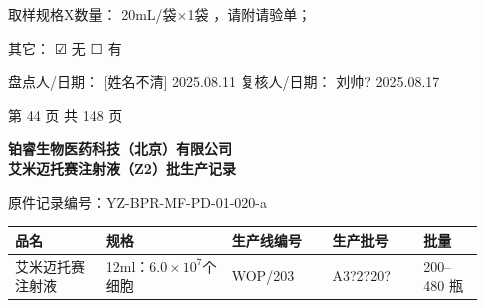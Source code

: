 \documentclass[UTF8,10pt,a4paper,fontset=fandol]{ctexart}
\newcommand{\fieldvalue}[1]{#1}
\newcommand{\handwritten}[1]{#1}
\newcommand{\checkboxfield}[1]{\ifstrequal{#1}{checked}{☑}{\ifstrequal{#1}{unclear}{?}{☐}}}
\begin{document}
\medskip

取样规格X数量：
\fieldvalue{\handwritten{20mL/袋$\times$1袋}}
，请附请验单；

\medskip

其它：
\fieldvalue{\handwritten{\checkboxfield{checked}}} 无
%
\fieldvalue{\checkboxfield{unchecked}} 有
\underline{\hspace{3cm}}

\medskip

盘点人/日期：
\fieldvalue{\handwritten{[姓名不清] 2025.08.11}}
\hfill
复核人/日期：
\fieldvalue{\handwritten{刘帅? 2025.08.17}}

\vfill

\begin{center}
第 44 页 共 148 页
\end{center}

\newpage

\begin{center}
\textbf{铂睿生物医药科技（北京）有限公司}\\
\textbf{艾米迈托赛注射液（Z2）批生产记录}
\end{center}

\noindent
原件\hfill 记录编号：YZ-BPR-MF-PD-01-020-a

\begin{center}
\begin{tabular}{|p{0.18\linewidth}|p{0.25\linewidth}|p{0.20\linewidth}|p{0.18\linewidth}|p{0.12\linewidth}|}
\hline
品名 & 规格 & 生产线编号 & 生产批号 & 批量\\
\hline
\fieldvalue{艾米迈托赛注射液} &
\fieldvalue{12ml：$6.0\times10^{7}$个细胞} &
\fieldvalue{\handwritten{WOP/203}} &
\fieldvalue{\handwritten{A3?2?20?}} &
\fieldvalue{200--480 瓶}\\
\hline
\end{tabular}
\end{center}
\end{document}
